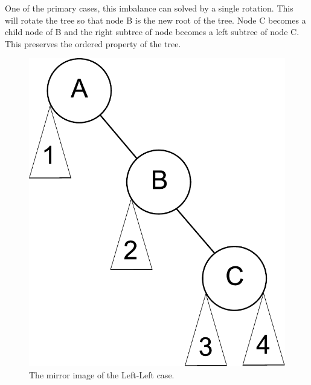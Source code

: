 One of the primary cases, this imbalance can solved by a single rotation.
This will rotate the tree so that node B is the new root of the tree.
Node C becomes a child node of B and the right subtree of node becomes a left subtree of node C.
This preserves the ordered property of the tree.

\begin{figure}[h]
\centering
\includegraphics[width=.33\textwidth]{right_right.pdf}
\caption{The mirror image of the Left-Left case.}
\end{figure}


